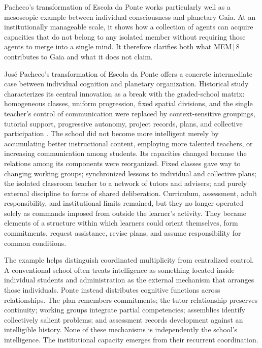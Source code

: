 \documentclass[11pt]{article}
\begin{document}
Pacheco's transformation of Escola da Ponte works particularly well as a mesoscopic example between individual consciousness and planetary Gaia. At an institutionally manageable scale, it shows how a collection of agents can acquire capacities that do not belong to any isolated member without requiring those agents to merge into a single mind. It therefore clarifies both what MEM\,$|$\,8 contributes to Gaia and what it does not claim.

José Pacheco's transformation of Escola da Ponte offers a concrete intermediate case between individual cognition and planetary organization. Historical study characterizes its central innovation as a break with the graded-school matrix: homogeneous classes, uniform progression, fixed spatial divisions, and the single teacher's control of communication were replaced by context-sensitive groupings, tutorial support, progressive autonomy, project records, plans, and collective participation \cite{silva2020}. The school did not become more intelligent merely by accumulating better instructional content, employing more talented teachers, or increasing communication among students. Its capacities changed because the relations among its components were reorganized. Fixed classes gave way to changing working groups; synchronized lessons to individual and collective plans; the isolated classroom teacher to a network of tutors and advisers; and purely external discipline to forms of shared deliberation. Curriculum, assessment, adult responsibility, and institutional limits remained, but they no longer operated solely as commands imposed from outside the learner's activity. They became elements of a structure within which learners could orient themselves, form commitments, request assistance, revise plans, and assume responsibility for common conditions.

The example helps distinguish coordinated multiplicity from centralized control. A conventional school often treats intelligence as something located inside individual students and administration as the external mechanism that arranges those individuals. Ponte instead distributes cognitive functions across relationships. The plan remembers commitments; the tutor relationship preserves continuity; working groups integrate partial competencies; assemblies identify collectively salient problems; and assessment records development against an intelligible history. None of these mechanisms is independently the school's intelligence. The institutional capacity emerges from their recurrent coordination.
\end{document}
